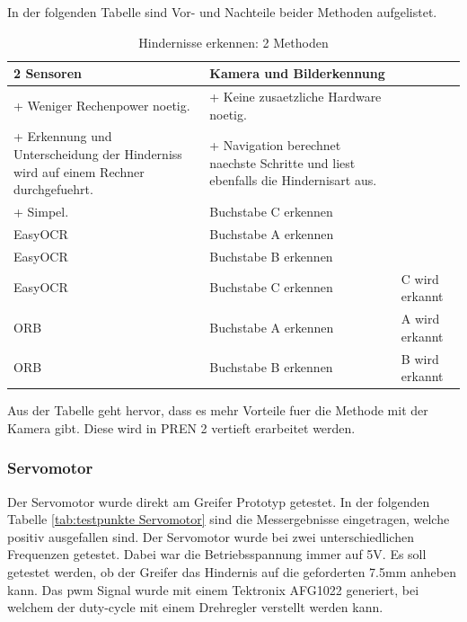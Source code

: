 In der folgenden Tabelle sind Vor- und Nachteile beider Methoden aufgelistet.



\begin{table}[H]
\centering
\small
\begin{tabularx}{\textwidth}{|X|X|}
        \hline
        \textbf{2 Sensoren} & \textbf{Kamera und Bilderkennung}\\
        \hline
        + Weniger Rechenpower noetig. & + Keine zusaetzliche Hardware noetig.  \\ \hline
        + Erkennung und Unterscheidung der Hinderniss wird auf einem Rechner durchgefuehrt.  & + Navigation berechnet naechste Schritte und liest ebenfalls die Hindernisart aus.  \\ \hline
        + Simpel. & Buchstabe C erkennen\\ \hline 
        EasyOCR & Buchstabe A erkennen\\ \hline
        EasyOCR & Buchstabe B erkennen  \\ \hline
        EasyOCR & Buchstabe C erkennen & C wird erkannt \\ \hline
        ORB & Buchstabe A erkennen & A wird erkannt \\ \hline
        ORB & Buchstabe B erkennen & B wird erkannt \\ \hline

\end{tabularx}
    \caption{Hindernisse erkennen: 2 Methoden}
\label{tab:obstacle-sensor}
\end{table}


Aus der Tabelle geht hervor, dass es mehr Vorteile fuer die Methode mit der Kamera gibt. Diese wird in PREN 2 vertieft erarbeitet werden.

\subsubsection*{Servomotor}


Der Servomotor wurde direkt am Greifer Prototyp getestet. In der folgenden Tabelle \ref{tab:testpunkte Servomotor} sind die Messergebnisse eingetragen, welche positiv ausgefallen sind. Der Servomotor wurde bei zwei unterschiedlichen Frequenzen getestet. Dabei war die Betriebsspannung immer auf 5V. Es soll getestet werden, ob der Greifer das Hindernis auf die geforderten 7.5mm anheben kann. Das \acrshort{pwm} Signal wurde mit einem Tektronix AFG1022 generiert, bei welchem der \gls{duty-cycle} mit einem Drehregler verstellt werden kann.

